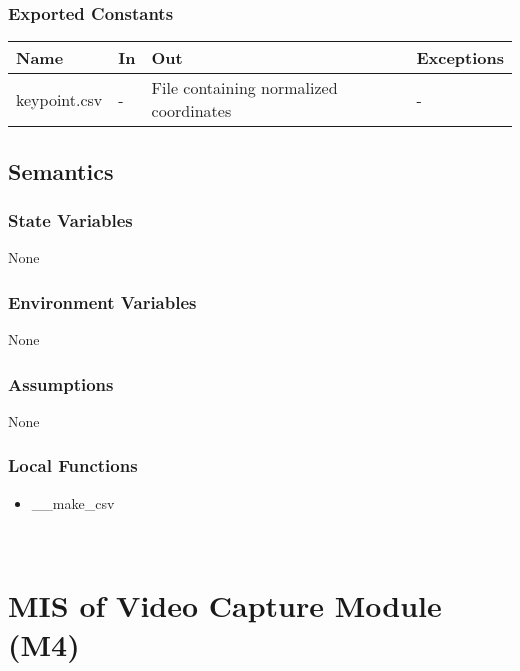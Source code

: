 \documentclass[12pt, titlepage]{article}
\begin{document}
\subsubsection{Exported Constants}

\begin{center}
\begin{tabular}{p{5cm} p{4cm} p{4cm} p{2cm}}
\hline
\textbf{Name} & \textbf{In} & \textbf{Out} & \textbf{Exceptions} \\
\hline
keypoint.csv & - & File containing normalized coordinates & - \\
\hline
\end{tabular}
\end{center}

\subsection{Semantics}

\subsubsection{State Variables}

None\\

\subsubsection{Environment Variables}

None\\

\subsubsection{Assumptions}

None

\subsubsection{Local Functions}
\begin{itemize}
\item \_\_make\_csv\\
\end{itemize}

~\newpage

\section{MIS of Video Capture Module (M4)} \label{M4}
\end{document}
